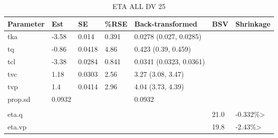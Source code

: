 \begin{table}
\centering\centering
\caption{ETA ALL DV 25}
\centering
\fontsize{8}{10}\selectfont
\begin{tabular}[t]{lllllll}
\toprule
\textbf{Parameter} & \textbf{Est} & \textbf{SE} & \textbf{\%RSE} & \textbf{Back-transformed} & \textbf{BSV} & \textbf{Shrinkage}\\
\midrule
tka & -3.58 & 0.014 & 0.391 & 0.0278 (0.027, 0.0285) &  & \\
\midrule
tq & -0.86 & 0.0418 & 4.86 & 0.423 (0.39, 0.459) &  & \\
\midrule
tcl & -3.38 & 0.0284 & 0.841 & 0.0341 (0.0323, 0.0361) &  & \\
\midrule
tvc & 1.18 & 0.0303 & 2.56 & 3.27 (3.08, 3.47) &  & \\
\midrule
tvp & 1.4 & 0.0414 & 2.96 & 4.04 (3.73, 4.39) &  & \\
\midrule
prop.sd & 0.0932 &  &  & 0.0932 &  & \\
\midrule\\
eta.q &  &  &  &  & 21.0 & -0.332\%>\\
\midrule
eta.vp &  &  &  &  & 19.8 & -2.43\%>\\
\bottomrule
\end{tabular}
\end{table}